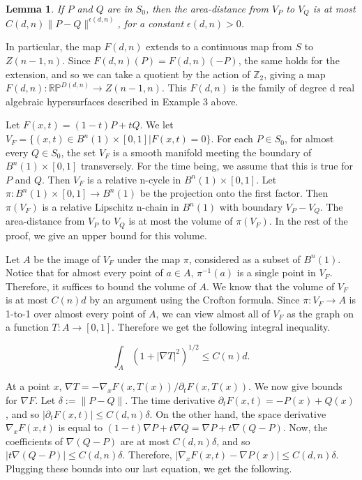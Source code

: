 \documentclass{amsart}
\newtheorem*{Theorem 1}{Theorem 1}
\newtheorem*{Theorem 2}{Theorem 2}
\newtheorem*{Theorem 1A}{Theorem 1A}
\newtheorem*{Theorem 2A}{Theorem 2A}
\newtheorem{lemma}{Lemma}[section]
\newtheorem*{vanishing lemma}{Vanishing Lemma}
\numberwithin{equation}{section}
\begin{document}
\begin{lemma} If $P$ and $Q$ are in $S_0$, then the area-distance
from $V_P$ to $V_Q$ is at most $C(d,n) \| P - Q
\|^{\epsilon(d,n)}$, for a constant $\epsilon(d,n) > 0$.
\end{lemma}

In particular, the map $F(d,n)$ extends to a continuous map from
$S$ to $Z(n-1,n)$.  Since $F(d,n)(P) = F(d,n)(-P)$, the same
holds for the extension, and so we can take a quotient by the
action of $\mathbb{Z}_2$, giving a map $F(d,n):
\mathbb{RP}^{D(d,n)} \rightarrow Z(n-1,n)$.  This $F(d,n)$ is
the family of degree d real algebraic hypersurfaces described
in Example 3 above.

\proof Let $F(x,t) = (1-t) P + t Q$.  We let $V_F = \{ (x,t) \in
B^n(1) \times [0,1] | F(x,t) = 0 \}$.  For each $P \in
S_0$, for almost every $Q \in S_0$, the set $V_F$ is a smooth
manifold meeting the boundary of $B^n(1) \times [0,1]$
transversely.  For the time being, we assume that this is true
for $P$ and $Q$.  Then $V_F$ is a relative n-cycle in $B^n(1)
\times [0,1]$.  Let $\pi: B^n(1) \times [0,1] \rightarrow B^n(1)$
be the projection onto the first factor.  Then $\pi(V_F)$ is a
relative Lipschitz n-chain in $B^n(1)$ with boundary $V_P - V_Q$. 
The area-distance from $V_P$ to $V_Q$ is at most the volume of
$\pi(V_F)$.  In the rest of the proof, we give an upper bound for
this volume.

Let $A$ be the image of $V_F$ under the map $\pi$, considered as
a subset of $B^n(1)$.  Notice that for almost every point of $a
\in A$, $\pi^{-1}(a)$ is a single point in $V_F$.  Therefore, it
suffices to bound the volume of $A$.  We know that the volume of
$V_F$ is at most $C(n) d$ by an argument using the Crofton
formula.  Since $\pi: V_F \rightarrow A$ is 1-to-1 over almost
every point of $A$, we can view almost all of $V_F$ as the graph
on a function $T: A \rightarrow [0,1]$.  Therefore we get the
following integral inequality.

$$\int_A (1 + |\nabla T|^2)^{1/2} \le C(n) d.$$ 

At a point $x$, $\nabla T = - \nabla_x F(x, T(x)) / \partial_t
F(x, T(x))$. We now give bounds for $\nabla F$.  Let $\delta :=
\| P - Q \|$.  The time derivative $\partial_t F(x, t) = - P(x) +
Q(x)$, and so $|\partial_t F(x,t)| \le C(d,n) \delta$.  On the
other hand, the space derivative $\nabla_x F(x,t)$ is equal to
$(1-t) \nabla P + t \nabla Q = \nabla P + t \nabla (Q-P)$.  Now,
the coefficients of $\nabla (Q-P)$ are at most $C(d,n) \delta$,
and so $| t \nabla (Q-P)| \le C(d,n) \delta$.  Therefore,
$|\nabla_x F(x,t) - \nabla P(x)| \le C(d,n) \delta$.  Plugging
these bounds into our last equation, we get the following.
\end{document}
